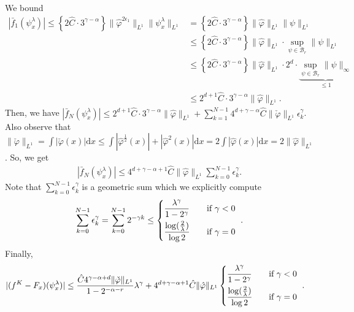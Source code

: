 We bound
\begin{align*}
    |\bar f_1(\psi_x^\lambda)| \leq \left\{ 2\hat C \cdot  3^{\gamma - \alpha} \right\} \lVert \hat \varphi^{2\epsilon_1} \rVert_{L^1} \lVert  \psi^{\lambda}_x \rVert_{L^1} &= \left\{ 2\hat C \cdot  3^{\gamma - \alpha} \right\} \lVert \hat \varphi \rVert_{L^1} \lVert  \psi \rVert_{L^1} \\
    &\leq \left\{ 2\hat C \cdot  3^{\gamma - \alpha} \right\}  \lVert \hat \varphi \rVert_{L^1} \cdot \sup_{\psi \in \mathcal{B}_r} \lVert  \psi \rVert_{L^1} \\
    &\leq \left\{ 2\hat C \cdot  3^{\gamma - \alpha} \right\}  \lVert \hat \varphi \rVert_{L^1} \cdot 2^d \cdot \underbrace{\sup_{\psi \in \mathcal{B}_r} \lVert  \psi \rVert_{\infty}}_{\leq 1} \\
    &\leq 2^{d+1}\hat C \cdot  3^{\gamma - \alpha}  \lVert \hat \varphi \rVert_{L^1}.
\end{align*}
Then, we have \(|\bar f_N(\psi_x^\lambda)| \leq 2^{d+1}\hat C \cdot  3^{\gamma - \alpha}  \lVert \hat \varphi \rVert_{L^1} + \sum^{N-1}_{k=1} 4^{d+\gamma-\alpha}\hat C \lVert \check \varphi \rVert_{L^1} \epsilon^\gamma_k\). Also observe that 
\(\lVert \check \varphi \rVert_{L^1} = \int |\check \varphi(x)| \mathrm{d}x \leq \int|\hat \varphi^{\frac{1}{2}}(x)| + |\hat \varphi^{2}(x)| \mathrm{d}x = 2\int |\hat \varphi(x)| \mathrm{d}x = 2 \lVert \hat \varphi \rVert_{L^1}\). So, we get 
\begin{align*}
|\bar f_N(\psi_x^\lambda)| \leq 4^{d + \gamma - \alpha + 1} \hat C \lVert \hat \varphi \rVert_{L^1} \sum^{N-1}_{k=0}\epsilon^\gamma_k.
\end{align*}
Note that \(\sum^{N-1}_{k=0}\epsilon^\gamma_k\) is a geometric sum which we explicitly compute
\begin{align*}
    \sum^{N-1}_{k=0}\epsilon^\gamma_k = 
    \sum^{N-1}_{k=0}2^{-\gamma k} \leq \begin{dcases}
        \frac{\lambda^\gamma}{1-2^\gamma} \quad &\text{if \(\gamma < 0\) } \\
        \frac{\log(\frac{2}{\lambda})}{\log 2} &\text{if \(\gamma = 0\) }
    \end{dcases}.
\end{align*} 
Finally,
\begin{align*}
    |(f^K - F_x)(\psi_x^\lambda)| &\leq  \frac{\hat C 4^{\gamma - \alpha + d} \lVert \check \varphi \rVert_{L^1} }{1-2^{-\alpha - r}} \lambda^{\gamma} + 4^{d + \gamma - \alpha + 1} \hat C \lVert \hat \varphi \rVert_{L^1}\begin{dcases}
        \frac{\lambda^\gamma}{1-2^\gamma} \quad &\text{if \(\gamma < 0\) } \\
        \frac{\log(\frac{2}{\lambda})}{\log 2} &\text{if \(\gamma = 0\) }
    \end{dcases}.
\end{align*}
